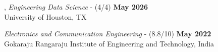 \vspace{-.005em}

, \textit{Engineering Data Science} - (4/4)%
\hfill \textbf{May 2026}
\\{\small University of Houston, TX}

\textit{Electronics and Communication Engineering} - {(8.8/10)} \hfill	\textbf{May 2022} \\{\small Gokaraju Rangaraju Institute of Engineering and Technology, India}  



\vspace{-0.15em}

